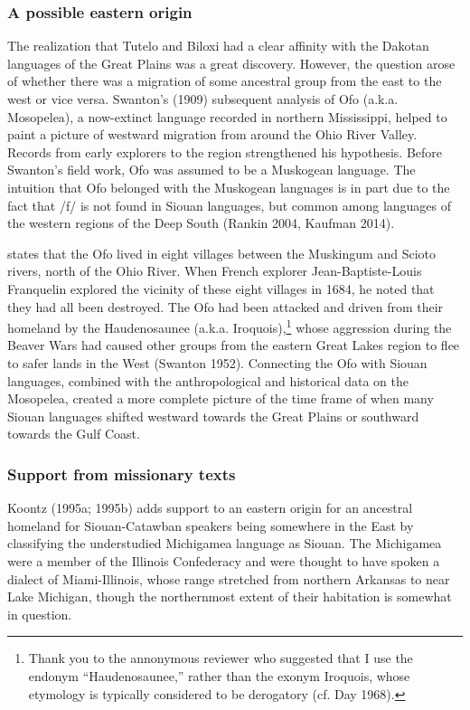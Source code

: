 \documentclass[output=paper]{LSP/langsci}
\begin{document}
\subsubsection{A possible eastern origin} The realization that Tutelo and Biloxi had a clear affinity with the Dakotan languages of the Great Plains was a great discovery. However, the question arose of whether there was a migration of some ancestral group from the east to the west or vice versa. Swanton's (1909) subsequent analysis of Ofo (a.k.a. Mosopelea), a now-extinct language recorded in northern Mississippi, helped to paint a picture of westward migration from around the Ohio River Valley. Records from early explorers to the region strengthened his hypothesis. Before Swanton's field work, Ofo was assumed to be a Muskogean language. The intuition that Ofo belonged with the Muskogean languages is in part due to the fact that /f/ is not found in Siouan languages, but common among languages of the western regions of the Deep South (Rankin 2004, Kaufman 2014). 

\citet{Hanna1911} states that the Ofo lived in eight villages between the Muskingum and Scioto rivers, north of the Ohio River. When French explorer Jean-Baptiste-Louis Franquelin explored the vicinity of these eight villages in 1684, he noted that they had all been destroyed. The Ofo had been attacked and driven from their homeland by the Haudenosaunee (a.k.a. Iroquois),\footnote{Thank you to the annonymous reviewer who suggested that I use the endonym ``Haudenosaunee,'' rather than the exonym Iroquois, whose etymology is typically considered to be derogatory (cf. Day 1968).} whose aggression during the Beaver Wars had caused other groups from the eastern Great Lakes region to flee to safer lands in the West (Swanton 1952). Connecting the Ofo with Siouan languages, combined with the anthropological and historical data on the Mosopelea, created a more complete picture of the time frame of when many Siouan languages shifted westward towards the Great Plains or southward towards the Gulf Coast. 

\subsubsection{Support from missionary texts} Koontz (1995a; 1995b) adds support to an eastern origin for an ancestral homeland for Siouan-Catawban speakers being somewhere in the East by classifying the understudied Michigamea language  as Siouan. The Michigamea were a member of the Illinois Confederacy and were thought to have spoken a dialect of Miami-Illinois, whose range stretched from northern Arkansas to near Lake Michigan, though the northernmost extent of their habitation is somewhat in question. 
\end{document}
